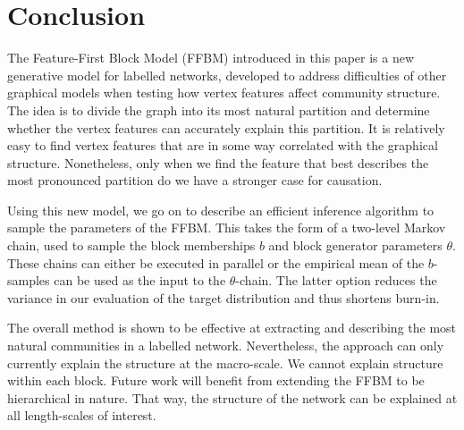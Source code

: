 \section{Conclusion}
\label{sec:conclusion}

The Feature-First Block Model (FFBM) introduced 
in this paper is a new generative model for labelled networks,
developed to address difficulties of other graphical models 
when testing how vertex features affect community structure. The idea 
is to divide the graph into its most natural partition and determine whether 
the vertex features can accurately explain this partition. 
It is relatively easy to find vertex features that are in some way 
correlated with the graphical structure. Nonetheless, only when 
we find the feature that best describes the most pronounced partition 
do we have a stronger case for causation.

Using this new model,
we go on to describe an efficient inference algorithm to sample 
the parameters of the FFBM. 
This takes the form of a two-level Markov chain,
used to sample the block memberships $b$ and block generator 
parameters $\theta$. These chains can either be executed
in parallel or 
the empirical mean of the $b$-samples can be used
as the input to the $\theta$-chain. The latter option
reduces the variance in our evaluation of the target distribution 
and thus shortens burn-in.

The overall method is shown to be effective at extracting and describing 
the most natural communities in a labelled network. Nevertheless, the approach 
can only currently explain the structure at the macro-scale. We cannot 
explain structure within each block. Future work will benefit from extending 
the FFBM to be hierarchical in nature. That way, the structure of the network 
can be explained at all length-scales of interest.


